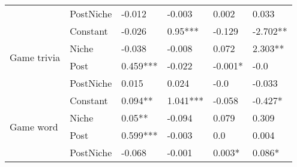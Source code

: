 \begin{table}[h!]
\begin{tabular}{llllll}
          & PostNiche &  -0.012 &  -0.003 &  0.002 &  0.033 \\
\cline{1-6}
\multirow{4}{*}{Game trivia} & Constant &  -0.026 &  0.95*** &  -0.129 &  -2.702** \\
          & Niche &  -0.038 &  -0.008 &  0.072 &  2.303** \\
          & Post &  0.459*** &  -0.022 &  -0.001* &  -0.0 \\
          & PostNiche &  0.015 &  0.024 &  -0.0 &  -0.033 \\
\cline{1-6}
\multirow{4}{*}{Game word} & Constant &  0.094** &  1.041*** &  -0.058 &  -0.427* \\
          & Niche &  0.05** &  -0.094 &  0.079 &  0.309 \\
          & Post &  0.599*** &  -0.003 &  0.0 &  0.004 \\
          & PostNiche &  -0.068 &  -0.001 &  0.003* &  0.086* \\
\bottomrule
\end{tabular}
\end{table}
